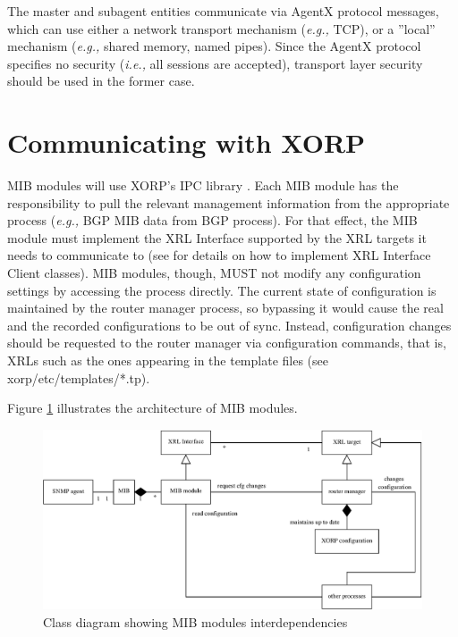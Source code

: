 \documentclass[11pt]{article}
\newcommand{\ie}{\emph{i.e.,}\xspace}
\newcommand{\eg}{\emph{e.g.,}\xspace}
\begin{document}
The master and subagent entities communicate via AgentX protocol messages, which
can use either a network transport mechanism (\eg TCP), or a ''local'' mechanism
(\eg shared memory, named pipes).  Since the AgentX protocol specifies no
security (\ie all sessions are accepted), transport layer security should be
used in the former case.


\section{Communicating with XORP}

MIB modules will use XORP's IPC library \cite{xorp:xrl}.  Each MIB module has the
responsibility to pull the relevant management information from the appropriate
process (\eg BGP MIB data from BGP process).  For that effect, the MIB module
must implement the XRL Interface supported by the XRL targets it needs to
communicate to (see \cite{xorp:xrl_interfaces} for details on how to implement
XRL Interface Client classes).  MIB modules, though, MUST not modify any
configuration settings by accessing the process directly.  The current state of
configuration is maintained by the router manager process, so bypassing it would
cause the real and the recorded configurations to be out of sync.  Instead,
configuration changes should be requested to the router manager via
configuration commands, that is, XRLs such as the ones appearing in the template
files (see xorp/etc/templates/*.tp).

Figure \ref{fig:mib-class-diag} illustrates the architecture of MIB modules.
\begin{figure}
  \begin{center}
    \includegraphics[width=1\textwidth]{figs/snmp_fig1}
  \end{center}
  \caption{Class diagram showing MIB modules interdependencies}
  \label{fig:mib-class-diag}
\end{figure}
\end{document}
